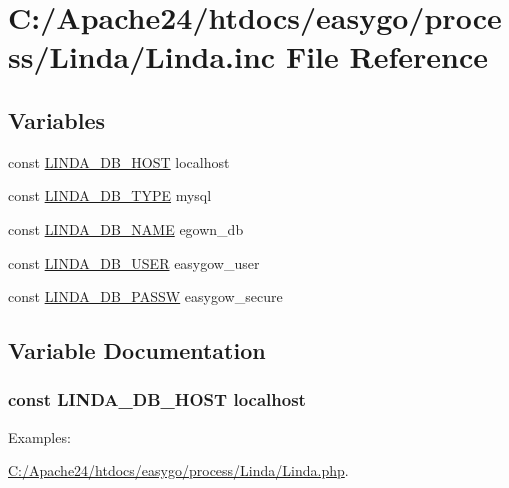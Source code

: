 \hypertarget{_linda_8inc}{}\section{C\+:/\+Apache24/htdocs/easygo/process/\+Linda/\+Linda.inc File Reference}
\label{_linda_8inc}
\subsection*{Variables}
\begin{DoxyCompactItemize}
\item 
const \hyperlink{_linda_8inc_a86b40c589d474db371ea58296a5eeb12}{L\+I\+N\+D\+A\+\_\+\+D\+B\+\_\+\+H\+O\+S\+T} \textquotesingle{}localhost\textquotesingle{}
\item 
const \hyperlink{_linda_8inc_a75c0048bcb27b8bf9d4e9fd1b9eb023b}{L\+I\+N\+D\+A\+\_\+\+D\+B\+\_\+\+T\+Y\+P\+E} \textquotesingle{}mysql\textquotesingle{}
\item 
const \hyperlink{_linda_8inc_a4e480c562d1f6701e89f603607ddbb54}{L\+I\+N\+D\+A\+\_\+\+D\+B\+\_\+\+N\+A\+M\+E} \textquotesingle{}egown\+\_\+db\textquotesingle{}
\item 
const \hyperlink{_linda_8inc_a713707c7fea371f7f3892136c1e852f0}{L\+I\+N\+D\+A\+\_\+\+D\+B\+\_\+\+U\+S\+E\+R} \textquotesingle{}easygow\+\_\+user\textquotesingle{}
\item 
const \hyperlink{_linda_8inc_aef9b254dff90502b875151a93b462df1}{L\+I\+N\+D\+A\+\_\+\+D\+B\+\_\+\+P\+A\+S\+S\+W} \textquotesingle{}easygow\+\_\+secure\textquotesingle{}
\end{DoxyCompactItemize}


\subsection{Variable Documentation}
\hypertarget{_linda_8inc_a86b40c589d474db371ea58296a5eeb12}{}
\subsubsection[{L\+I\+N\+D\+A\+\_\+\+D\+B\+\_\+\+H\+O\+S\+T}]{\setlength{\rightskip}{0pt plus 5cm}const L\+I\+N\+D\+A\+\_\+\+D\+B\+\_\+\+H\+O\+S\+T \textquotesingle{}localhost\textquotesingle{}}\label{_linda_8inc_a86b40c589d474db371ea58296a5eeb12}
\begin{Desc}
\item[Examples\+: ]\par
\hyperlink{_c_1_2_apache24_2htdocs_2easygo_2process_2_linda_2_linda_8php-example}{C\+:/\+Apache24/htdocs/easygo/process/\+Linda/\+Linda.\+php}.\end{Desc}


